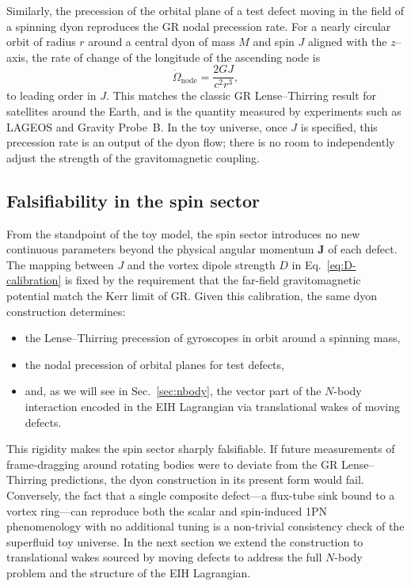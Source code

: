 \documentclass[11pt]{article}
\begin{document}
Similarly, the precession of the orbital plane of a test defect
moving in the field of a spinning dyon reproduces the GR nodal
precession rate.
For a nearly circular orbit of radius $r$ around a central dyon of
mass $M$ and spin $J$ aligned with the $z$–axis, the rate of change
of the longitude of the ascending node is
\begin{equation}
  \dot{\Omega}_{\text{node}}
  = \frac{2GJ}{c^2 r^3},
\end{equation}
to leading order in $J$.
This matches the classic GR Lense--Thirring result for satellites
around the Earth, and is the quantity measured by experiments such
as LAGEOS and Gravity Probe~B.
In the toy universe, once $J$ is specified, this precession rate is
an output of the dyon flow; there is no room to independently adjust
the strength of the gravitomagnetic coupling.

\subsection{Falsifiability in the spin sector}
\label{subsec:spin-falsifiability}

From the standpoint of the toy model, the spin sector introduces no
new continuous parameters beyond the physical angular momentum
$\mathbf{J}$ of each defect.
The mapping between $J$ and the vortex dipole strength $D$ in
Eq.~\eqref{eq:D-calibration} is fixed by the requirement that the
far-field gravitomagnetic potential match the Kerr limit of GR.
Given this calibration, the same dyon construction determines:

\begin{itemize}
  \item the Lense--Thirring precession of gyroscopes in orbit around
        a spinning mass,
  \item the nodal precession of orbital planes for test defects,
  \item and, as we will see in Sec.~\ref{sec:nbody}, the vector part
        of the $N$-body interaction encoded in the EIH Lagrangian via
        translational wakes of moving defects.
\end{itemize}

This rigidity makes the spin sector sharply falsifiable.
If future measurements of frame-dragging around rotating bodies were
to deviate from the GR Lense--Thirring predictions, the dyon
construction in its present form would fail.
Conversely, the fact that a single composite defect---a flux-tube
sink bound to a vortex ring---can reproduce both the scalar and
spin-induced 1PN phenomenology with no additional tuning is a
non-trivial consistency check of the superfluid toy universe.
In the next section we extend the construction to translational wakes
sourced by moving defects to address the full $N$-body problem and the
structure of the EIH Lagrangian.
\end{document}
